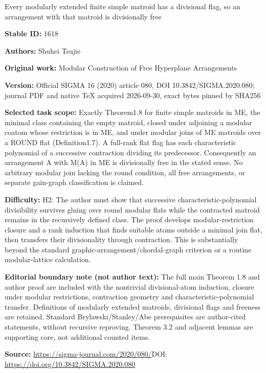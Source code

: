 \documentclass[11pt]{article}
\begin{document}
\begin{center}\Large Every modularly extended finite simple matroid has a divisional flag, so an arrangement with that matroid is divisionally free\end{center}
\noindent\textbf{Stable ID:} 1618\par
\noindent\textbf{Authors:} Shuhei Tsujie\par
\noindent\textbf{Original work:} Modular Construction of Free Hyperplane Arrangements\par
\noindent\textbf{Version:} Official SIGMA 16 (2020) article 080, DOI 10.3842/SIGMA.2020.080; journal PDF and native TeX acquired 2026-09-30, exact bytes pinned by SHA256\par
\noindent\textbf{Selected task scope:} Exactly Theorem1.8 for finite simple matroids in ME, the minimal class containing the empty matroid, closed under adjoining a modular coatom whose restriction is in ME, and under modular joins of ME matroids over a ROUND flat (Definition1.7). A full-rank flat flag has each characteristic polynomial of a successive contraction dividing its predecessor. Consequently an arrangement A with M(A) in ME is divisionally free in the stated sense. No arbitrary modular join lacking the round condition, all free arrangements, or separate gain-graph classification is claimed.\par
\noindent\textbf{Difficulty:} H2: The author must show that successive characteristic-polynomial divisibility survives gluing over round modular flats while the contracted matroid remains in the recursively defined class. The proof develops modular-restriction closure and a rank induction that finds suitable atoms outside a minimal join flat, then transfers their divisionality through contraction. This is substantially beyond the standard graphic-arrangement/chordal-graph criterion or a routine modular-lattice calculation.\par
\noindent\textbf{Editorial boundary note (not author text):} The full main Theorem 1.8 and author proof are included with the nontrivial divisional-atom induction, closure under modular restrictions, contraction geometry and characteristic-polynomial transfer. Definitions of modularly extended matroids, divisional flags and freeness are retained. Standard Brylawski/Stanley/Abe prerequisites are author-cited statements, without recursive reproving. Theorem 3.2 and adjacent lemmas are supporting core, not additional counted items.\par
\noindent\textbf{Source:} \url{https://sigma-journal.com/2020/080/}\quad DOI: \url{https://doi.org/10.3842/SIGMA.2020.080}\par
\end{document}
